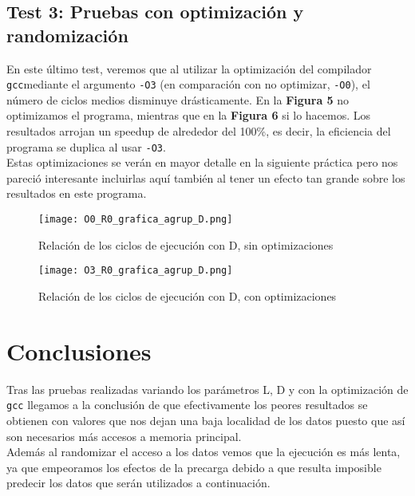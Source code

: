 \documentclass[a4paper,twocolumn]{article}
\begin{document}
    \subsection{Test 3: Pruebas con optimización y randomización}
    En este último test, veremos que al utilizar la optimización del compilador \texttt{gcc}mediante el argumento \texttt{-O3} (en comparación con no optimizar, \texttt{-O0}), el número de ciclos medios disminuye drásticamente. En la \textbf{Figura 5} no optimizamos el programa, mientras que en la \textbf{Figura 6} si lo hacemos. Los resultados arrojan un speedup de alrededor del 100\%, es decir, la eficiencia del programa se duplica al usar \texttt{-O3}. \\
    
    Estas optimizaciones se verán en mayor detalle en la siguiente práctica pero nos pareció interesante incluirlas aquí también al tener un efecto tan grande sobre los resultados en este programa. \\
    
    \begin{figure}[h!] 
        \centering
        \texttt{[image: O0\_R0\_grafica\_agrup\_D.png]}
        \caption{Relación de los ciclos de ejecución con D, sin optimizaciones}
    \end{figure}
    
    \begin{figure}[h!] 
    	\centering
            \texttt{[image: O3\_R0\_grafica\_agrup\_D.png]}
            \caption{Relación de los ciclos de ejecución con D, con optimizaciones}
    \end{figure}

    \vfill\null
    \section{Conclusiones}
    Tras las pruebas realizadas variando los parámetros L, D y con la optimización de \texttt{gcc} llegamos a la conclusión de que efectivamente los peores resultados se obtienen con valores que nos dejan una baja localidad de los datos puesto que así son necesarios más accesos a memoria principal. \\
    Además al randomizar el acceso a los datos vemos que la ejecución es más lenta, ya que empeoramos los efectos de la precarga debido a que resulta imposible predecir los datos que serán utilizados a continuación.\\
    
\end{document}

